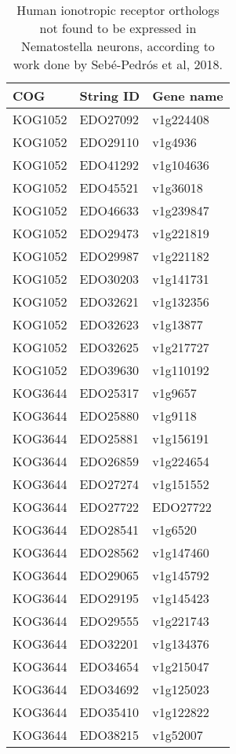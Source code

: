 \begin{longtable}[l]{lll}
\caption{\label{tab:unnamed-chunk-6}Human ionotropic receptor orthologs not found to be expressed in Nematostella neurons, according to work done by Sebé-Pedrós et al, 2018.}\\
\toprule
COG & String ID & Gene name\\
\midrule
\rowcolor{gray!6}  KOG1052 & EDO27092 & v1g224408\\
KOG1052 & EDO29110 & v1g4936\\
\rowcolor{gray!6}  KOG1052 & EDO41292 & v1g104636\\
KOG1052 & EDO45521 & v1g36018\\
\rowcolor{gray!6}  KOG1052 & EDO46633 & v1g239847\\
KOG1052 & EDO29473 & v1g221819\\
\rowcolor{gray!6}  KOG1052 & EDO29987 & v1g221182\\
KOG1052 & EDO30203 & v1g141731\\
\rowcolor{gray!6}  KOG1052 & EDO32621 & v1g132356\\
KOG1052 & EDO32623 & v1g13877\\
\rowcolor{gray!6}  KOG1052 & EDO32625 & v1g217727\\
KOG1052 & EDO39630 & v1g110192\\
\rowcolor{gray!6}  KOG3644 & EDO25317 & v1g9657\\
KOG3644 & EDO25880 & v1g9118\\
\rowcolor{gray!6}  KOG3644 & EDO25881 & v1g156191\\
KOG3644 & EDO26859 & v1g224654\\
\rowcolor{gray!6}  KOG3644 & EDO27274 & v1g151552\\
KOG3644 & EDO27722 & EDO27722\\
\rowcolor{gray!6}  KOG3644 & EDO28541 & v1g6520\\
KOG3644 & EDO28562 & v1g147460\\
\rowcolor{gray!6}  KOG3644 & EDO29065 & v1g145792\\
KOG3644 & EDO29195 & v1g145423\\
\rowcolor{gray!6}  KOG3644 & EDO29555 & v1g221743\\
KOG3644 & EDO32201 & v1g134376\\
\rowcolor{gray!6}  KOG3644 & EDO34654 & v1g215047\\
KOG3644 & EDO34692 & v1g125023\\
\rowcolor{gray!6}  KOG3644 & EDO35410 & v1g122822\\
KOG3644 & EDO38215 & v1g52007\\

\end{longtable}
